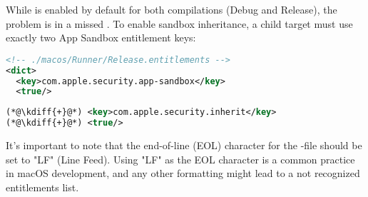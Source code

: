 \noindent While  is enabled by default for both compilations (Debug and Release), the problem is in a 
missed . To enable sandbox inheritance, a child target must use exactly two App Sandbox 
entitlement keys:

\begin{lstlisting}[language=xml]
<!-- ./macos/Runner/Release.entitlements -->
<dict>
  <key>com.apple.security.app-sandbox</key>
  <true/>
\end{lstlisting}
{
\xpretocmd{\lstlisting}{\vspace{-14pt}}{}{}
\begin{lstlisting}[firstnumber=5, language=xml, backgroundcolor=\color{backgreen}]
(*@\kdiff{+}@*) <key>com.apple.security.inherit</key>
(*@\kdiff{+}@*) <true/>
\end{lstlisting}
}

\noindent It's important to note that the end-of-line (EOL) character for the -file 
should be set to "LF" (Line Feed). Using "LF" as the EOL character is a common practice in macOS development, and 
any other formatting might lead to a not recognized entitlements list.

